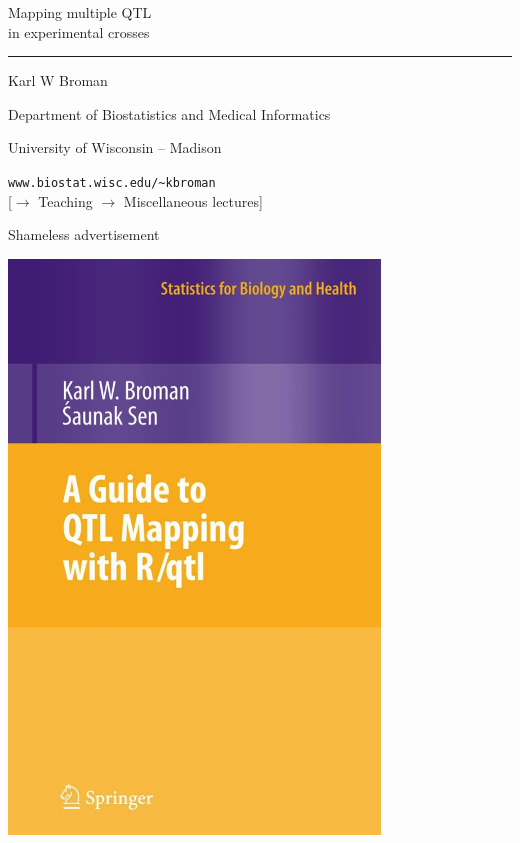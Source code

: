 \documentclass[12pt]{article}
\newcommand{\titlesize}{\fontsize{40}{50} \selectfont}
\newcommand{\headsize}{\fontsize{35}{35} \selectfont}
\newcommand{\textsize}{\fontsize{30}{35} \selectfont}
\newcommand{\smallsize}{\fontsize{25}{30} \selectfont}
\newcommand{\smallestsize}{\fontsize{18}{22} \selectfont}
\begin{document}
\thispagestyle{empty}

\begin{center}
\titlesize \color{myyellow}

\vspace*{15mm}

Mapping multiple QTL \\ in experimental crosses

\color{mypink}
\rule{10in}{1mm}

\vspace{5mm}

\textsize \color{myblue}
Karl W Broman
\vspace{5mm}

\color{mywhite}
{\smallsize Department of Biostatistics and Medical Informatics

University of Wisconsin -- Madison
\vspace{20mm}


\verb|www.biostat.wisc.edu/~kbroman| \\
{\smallestsize \color{myblue} 
[$\rightarrow$ Teaching $\rightarrow$ Miscellaneous lectures]}
}

\end{center}

\newpage

\thispagestyle{empty}

\headsize \color{myyellow}
\hfill \begin{minipage}{5.75in}
\centering
Shameless advertisement
\end{minipage}

\vspace{20mm}

\centerline{\includegraphics[height=6in]{Figs/book_cover_lg.jpg}}
\end{document}
